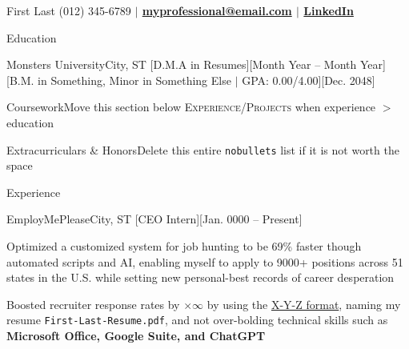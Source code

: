 \documentclass[10pt]{extarticle} %
\begin{document}
\lrHeader
{First Last}
{(012) 345-6789 \textbf{
        $\vert$ \href{mailto:myprofessional@email.com}{myprofessional@email.com}
        $\vert$ \href{https://www.youtube.com/watch?v=dQw4w9WgXcQ}{LinkedIn}}}

\begin{sectionList}{Education}
    \item \lr
    {Monsters University}{City, ST}
    [D.M.A in Resumes][Month Year -- Month Year]
    [B.M. in Something, Minor in Something Else $\vert$ GPA: 0.00/4.00][Dec. 2048]
    \begin{nobullets}
        \item {}
        {Coursework}{Move this section below \textsc{Experience/Projects} when experience $>$ education}
        \item {}
        {Extracurriculars \& Honors}{Delete this entire \texttt{nobullets} list if it is not worth the space}
    \end{nobullets}
\end{sectionList}


\begin{sectionList}{Experience}
    \item \lr
    {EmployMePlease}{City, ST}
    [CEO Intern][Jan. 0000 -- Present]
    \begin{bullets}
        \item Optimized a customized system for job hunting to be 69\% faster though automated scripts and AI, enabling myself to apply to 9000+ positions across 51 states in the U.S. while setting new personal-best records of career desperation
        \item Boosted recruiter response rates by $\times \infty$ by using the \href{https://www.inc.com/bill-murphy-jr/google-recruiters-say-these-5-resume-tips-including-x-y-z-formula-will-improve-your-odds-of-getting-hired-at-google.html}{X-Y-Z format}, naming my resume \texttt{First-Last-Resume.pdf}, and not over-bolding technical skills such as \textbf{Microsoft Office, Google Suite, and ChatGPT}
    \end{bullets}
\end{sectionList}
\end{document}
